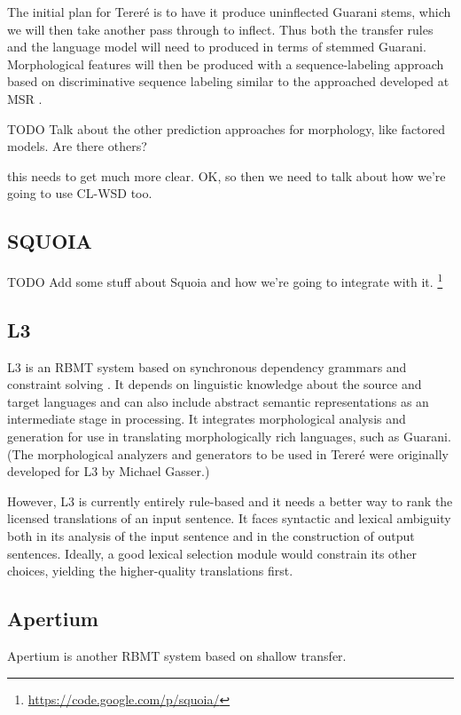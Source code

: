 The initial plan for Tereré is to have it produce uninflected Guarani stems,
which we will then take another pass through to inflect.
Thus both the transfer rules and the language model will need to produced in
terms of stemmed Guarani.
Morphological features will then be produced with a sequence-labeling approach
based on discriminative sequence labeling similar to the approached developed
at MSR \cite{toutanova-suzuki-ruopp:2008:ACLMain}.

TODO Talk about the other prediction approaches for morphology, like factored
models. Are there others?

this needs to get much more clear.
OK, so then we need to talk about how we're going to use CL-WSD too.

\subsection{SQUOIA}
TODO Add some stuff about Squoia and how we're going to integrate with it.
\cite{riosgonzales-gohring:2013:HyTra}
\footnote{\url{https://code.google.com/p/squoia/}}

\subsection{L3}
L3 is an RBMT system based on synchronous dependency grammars and constraint
solving \cite{gasser:sxdg,gasser:aflat2012}.
It depends on linguistic knowledge about the source and target languages and
can also include abstract semantic representations as an intermediate stage in
processing. It integrates morphological analysis and generation for use in
translating morphologically rich languages, such as Guarani.
(The morphological analyzers and generators to be used in Tereré were
originally developed for L3 by Michael Gasser.)

However, L3 is currently entirely rule-based and it needs a better way to rank
the licensed translations of an input sentence. It faces syntactic and lexical
ambiguity both in its analysis of the input sentence and in the construction of
output sentences. Ideally, a good lexical selection module would constrain its
other choices, yielding the higher-quality translations first.

\subsection{Apertium}
Apertium is another RBMT system based on shallow transfer.

\cite{Forcada_theapertium}
